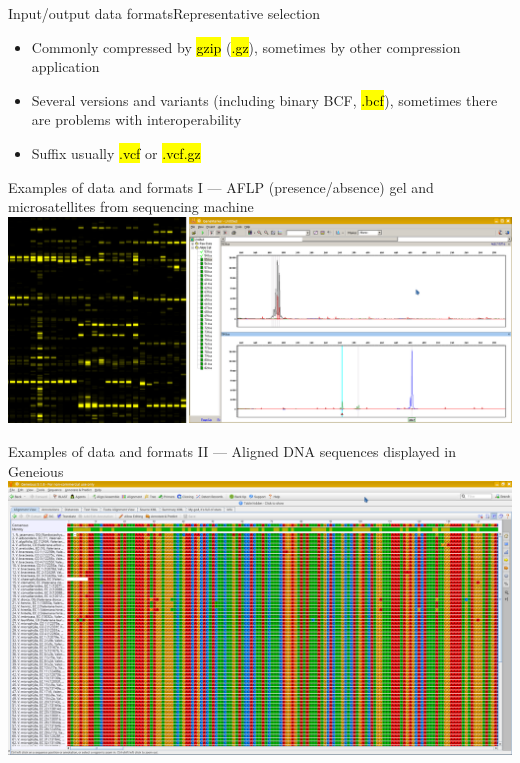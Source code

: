 \documentclass[compress, ucs, xelatex, 11pt, xcolor=svgnames,
	hyperref={
		bookmarks=true,
		unicode=true,
		colorlinks=true,
		pdftitle={Molecular data in R},
		plainpages=false,
		pdfauthor={Vojtech Zeisek},
		pdfsubject={Course about phylogeny and evolution in R},
		pdfcreator={XeLaTeX},
		pdfkeywords={R, evolution, phylogeny, molecular data},
		linkcolor=Tomato,
		anchorcolor=SaddleBrown,
		citecolor=Goldenrod,
		filecolor=DarkMagenta,
		menucolor=Sienna,
		urlcolor=DarkTurquoise,
		pdftex},
	url={hyphens, lowtilde} %
	]{beamer}
\renewcommand{\texttt}[1]{\hl{\ttfamily #1}}
\begin{document}
\begin{frame}[allowframebreaks]{Input/output data formats}{Representative selection}
\begin{itemize}
\begin{itemize}
			\item Commonly compressed by \texttt{gzip} (\texttt{*.gz}), sometimes by other compression application
			\item Several versions and variants (including binary BCF, \texttt{*.bcf}), sometimes there are problems with interoperability
			\item Suffix usually \texttt{*.vcf} or \texttt{*.vcf.gz}
		\end{itemize}
	\end{itemize}
\end{frame}

\begin{frame}{Examples of data and formats I --- AFLP (presence/absence) gel and microsatellites from sequencing machine}
	\includegraphics[width=\textwidth]{aflp_ssrs.png}
\end{frame}

\begin{frame}{Examples of data and formats II --- Aligned DNA sequences displayed in Geneious}
	\includegraphics[width=\textwidth]{alignment_geneious.png}
\end{frame}
\end{document}
